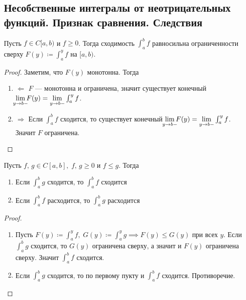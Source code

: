 \subsection{Несобственные интегралы от неотрицательных функций. Признак сравнения. Следствия}
\begin{theorem}
    Пусть $f \in C[a, b)$ и $f \geq 0$. Тогда сходимость $\int_{a}^{b} f$ равносильна ограниченности сверху $F(y) \coloneqq \int_{a}^{y} f$ на $[a, b)$.
  \end{theorem}
  \begin{proof}
    Заметим, что $F(y)$ монотонна. Тогда
    \begin{enumerate}
      \item[]$\boxed{\Leftarrow}$
      $F$ --- монотонна и ограничена, значит существует конечный $\lim\limits_{\mathclap{y \to b-}}F(y) = \lim\limits_{y \to b-}\int_{a}^{y} f$.
      \item[]$\boxed{\Rightarrow}$
      Если $\int_{a}^{b} f$ сходится, то существует конечный $\lim\limits_{\mathclap{y \to b-}} F(y) = \lim\limits_{y \to b-} \int_{a}^{y} f$. Значит $F$ ограничена.
    \end{enumerate}
  \end{proof}
  
  \begin{theorem}
  Пусть $f,\, g \in C[a, b], \; f,\, g \geq 0$ и $f \leq g$. Тогда
  \begin{enumerate}
      \item Если $\int_{a}^{b} g$ сходится, то $\int_{a}^{b} f$ сходится
      \item Если $\int_{a}^{b} f$ расходится, то $\int_{a}^{b} g$ расходится
  \end{enumerate}
  \end{theorem}
  \begin{proof} \quad 
    
    \begin{enumerate}
      \item Пусть $F(y) \coloneqq \int_{a}^{y} f, \; G(y) \coloneqq \int_{a}^{y} g \implies F(y) \leq G(y)$ при всех $y$. Если $\int_{a}^{b} g$ сходится, то $G(y)$ ограничена сверху, а значит и $F(y)$ ограничена сверху. Значит $\int_{a}^{b} f$ сходится.
      \item Если $\int_{a}^{b} g$ сходится, то по первому пукту и $\int_{a}^{b} f$ сходится. Противоречие.
      \end{enumerate}
  \end{proof}
  
